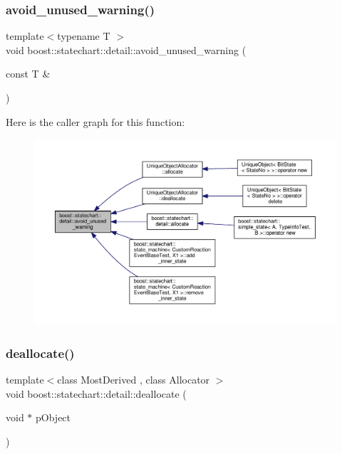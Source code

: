 \subsubsection{\texorpdfstring{avoid\+\_\+unused\+\_\+warning()}{avoid\_unused\_warning()}}
{\footnotesize\ttfamily template$<$typename T $>$ \\
void boost\+::statechart\+::detail\+::avoid\+\_\+unused\+\_\+warning (\begin{DoxyParamCaption}\item[{const T \&}]{ }\end{DoxyParamCaption})\hspace{0.3cm}{\ttfamily [inline]}}

Here is the caller graph for this function\+:
\nopagebreak
\begin{figure}[H]
\begin{center}
\leavevmode
\includegraphics[width=350pt]{namespaceboost_1_1statechart_1_1detail_a4c8f28e86a5c5c087b5a1b2e546cc93b_icgraph}
\end{center}
\end{figure}
\mbox{\label{namespaceboost_1_1statechart_1_1detail_a2137e00f346972cc349b4eb44a806213}} 
\subsubsection{\texorpdfstring{deallocate()}{deallocate()}}
{\footnotesize\ttfamily template$<$class Most\+Derived , class Allocator $>$ \\
void boost\+::statechart\+::detail\+::deallocate (\begin{DoxyParamCaption}\item[{void $\ast$}]{p\+Object }\end{DoxyParamCaption})}


